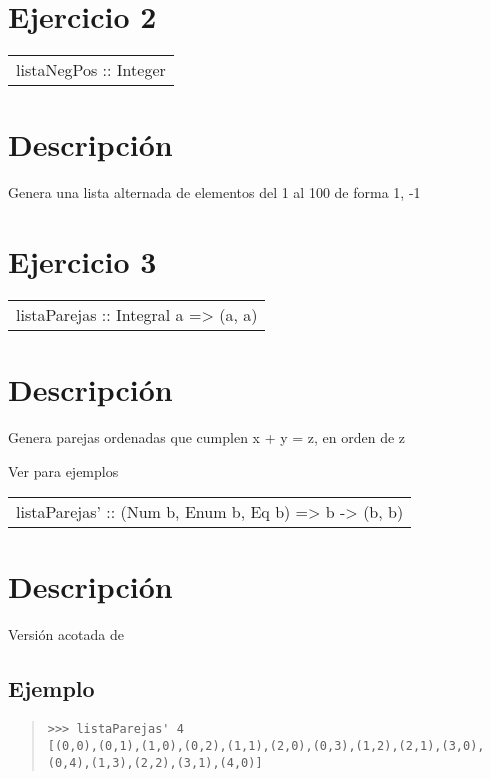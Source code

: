\section{Ejercicio 2}
\begin{haddockdesc}
\item[\begin{tabular}{@{}l}
listaNegPos :: {\char 91}Integer{\char 93}
\end{tabular}]
{\haddockbegindoc
\section*{Descripción}
Genera una lista alternada de elementos del 1 al 100 de forma {}1, -1{}\par}
\end{haddockdesc}
\section{Ejercicio 3}
\begin{haddockdesc}
\item[\begin{tabular}{@{}l}
listaParejas :: Integral a => {\char 91}(a, a){\char 93}
\end{tabular}]
{\haddockbegindoc
\section*{Descripción}
Genera parejas ordenadas que cumplen x + y = z, en orden de z\par
Ver  para ejemplos\par}
\end{haddockdesc}
\begin{haddockdesc}
\item[\begin{tabular}{@{}l}
listaParejas' :: (Num b, Enum b, Eq b) => b -> {\char 91}(b, b){\char 93}
\end{tabular}]
{\haddockbegindoc
\section*{Descripción}
Versión acotada de \par
\subsection*{Ejemplo}
\begin{quote}
{\haddockverb\begin{verbatim}
>>> listaParejas' 4
[(0,0),(0,1),(1,0),(0,2),(1,1),(2,0),(0,3),(1,2),(2,1),(3,0),(0,4),(1,3),(2,2),(3,1),(4,0)]

\end{verbatim}}
\end{quote}}
\end{haddockdesc}
